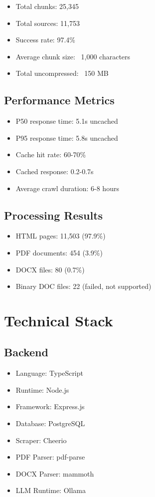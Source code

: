 \documentclass[12pt]{article}
\begin{document}
\begin{itemize}
    \item Total chunks: 25,345
    \item Total sources: 11,753
    \item Success rate: 97.4\%
    \item Average chunk size: ~1,000 characters
    \item Total uncompressed: ~150 MB
\end{itemize}

\subsection{Performance Metrics}

\begin{itemize}
    \item P50 response time: 5.1s uncached
    \item P95 response time: 5.8s uncached
    \item Cache hit rate: 60-70\%
    \item Cached response: 0.2-0.7s
    \item Average crawl duration: 6-8 hours
\end{itemize}

\subsection{Processing Results}

\begin{itemize}
    \item HTML pages: 11,503 (97.9\%)
    \item PDF documents: 454 (3.9\%)
    \item DOCX files: 80 (0.7\%)
    \item Binary DOC files: 22 (failed, not supported)
\end{itemize}

\section{Technical Stack}

\subsection{Backend}

\begin{itemize}
    \item Language: TypeScript
    \item Runtime: Node.js
    \item Framework: Express.js
    \item Database: PostgreSQL
    \item Scraper: Cheerio
    \item PDF Parser: pdf-parse
    \item DOCX Parser: mammoth
    \item LLM Runtime: Ollama
\end{itemize}
\end{document}
